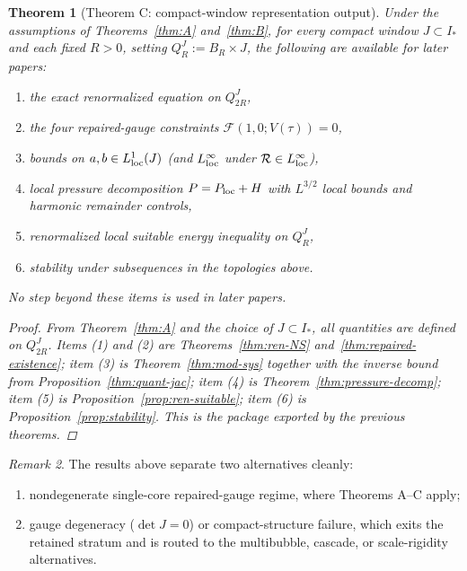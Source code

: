 \documentclass[11pt]{amsart}
\theoremstyle{plain}
\newtheorem{theorem}{Theorem}[section]
\theoremstyle{definition}
\theoremstyle{remark}
\newtheorem{remark}[theorem]{Remark}
\begin{document}
\begin{theorem}[Theorem C: compact-window representation output]\label{thm:C}
Under the assumptions of Theorems~\ref{thm:A} and~\ref{thm:B}, for every compact
window \(J\subset I_*\) and each fixed \(R>0\), setting
\(Q_R^J:=B_R\times J\), the
following are available for later papers:
\begin{enumerate}
\item the exact renormalized equation on \(Q_{2R}^J\),
\item the four repaired-gauge constraints \(\mathcal F(1,0;V(\tau))=0\),
\item bounds on \(a,b\in L^1_{\rm loc}(J)\) (and \(L^\infty_{\rm loc}\) under
  \(\mathcal R\in L^\infty_{\rm loc}\)),
\item local pressure decomposition \(P=P_{\rm loc}+H\) with \(L^{3/2}\) local bounds and
  harmonic remainder controls,
	\item renormalized local suitable energy inequality on \(Q_R^J\),
	\item stability under subsequences in the topologies above.
\end{enumerate}
No step beyond these items is used in later papers.
\begin{proof}
From Theorem~\ref{thm:A} and the choice of \(J\subset I_*\), all quantities are defined on \(Q_{2R}^J\).
Items (1) and (2) are Theorems~\ref{thm:ren-NS} and~\ref{thm:repaired-existence};
item (3) is Theorem~\ref{thm:mod-sys} together with the inverse bound from
Proposition~\ref{thm:quant-jac}; item (4) is Theorem~\ref{thm:pressure-decomp};
item (5) is Proposition~\ref{prop:ren-suitable}; item (6) is
Proposition~\ref{prop:stability}. This is the package exported by the previous theorems.
\end{proof}
\end{theorem}

\begin{remark}
The results above separate two alternatives cleanly:
\begin{enumerate}
\item nondegenerate single-core repaired-gauge regime, where Theorems A--C apply;
\item gauge degeneracy (\(\det J=0\)) or compact-structure failure, which exits
the retained stratum and is routed to the multibubble, cascade, or
scale-rigidity alternatives.
\end{enumerate}
\end{remark}



\end{document}
